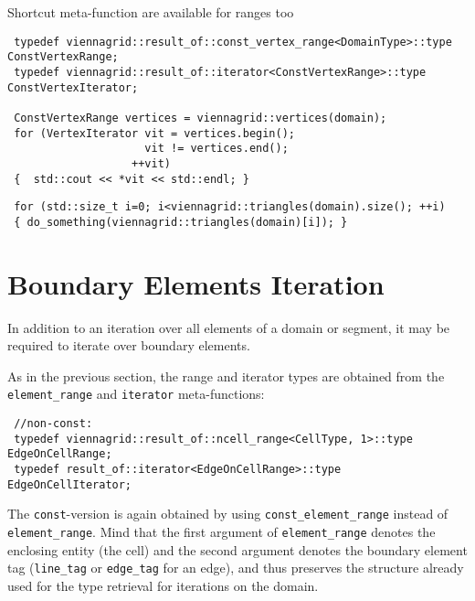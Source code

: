 Shortcut meta-function are available for ranges too
\begin{lstlisting}
 typedef viennagrid::result_of::const_vertex_range<DomainType>::type   ConstVertexRange;
 typedef viennagrid::result_of::iterator<ConstVertexRange>::type         ConstVertexIterator;

 ConstVertexRange vertices = viennagrid::vertices(domain);
 for (VertexIterator vit = vertices.begin();
                     vit != vertices.end();
                   ++vit)
 {  std::cout << *vit << std::endl; }
\end{lstlisting}

\begin{lstlisting}
 for (std::size_t i=0; i<viennagrid::triangles(domain).size(); ++i)
 { do_something(viennagrid::triangles(domain)[i]); }
\end{lstlisting}

\section{Boundary Elements Iteration}
In addition to an iteration over all elements of a domain or segment, it may be required to iterate over boundary elements.


As in the previous section, the range and iterator types are obtained from the \lstinline|element_range| and \lstinline|iterator| meta-functions:
\begin{lstlisting}
 //non-const:
 typedef viennagrid::result_of::ncell_range<CellType, 1>::type    EdgeOnCellRange;
 typedef result_of::iterator<EdgeOnCellRange>::type    EdgeOnCellIterator;
\end{lstlisting}
The \lstinline|const|-version is again obtained by using \lstinline|const_element_range| instead of \lstinline|element_range|.
Mind that the first argument of \lstinline|element_range| denotes the enclosing entity (the cell) and the second argument denotes the boundary element tag (\lstinline|line_tag| or \lstinline|edge_tag| for an edge), and thus preserves the structure already used for the type retrieval for iterations on the domain.

